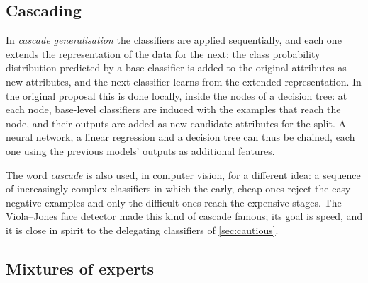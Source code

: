\subsection{Cascading}

In \emph{cascade generalisation} \citep{gama2000cascade} the classifiers are applied
sequentially, and each one extends the representation of the data for the next: the class
probability distribution predicted by a base classifier is added to the original attributes as
new attributes, and the next classifier learns from the extended representation. In the
original proposal this is done locally, inside the nodes of a decision tree: at each node,
base-level classifiers are induced with the examples that reach the node, and their outputs are
added as new candidate attributes for the split. A neural network, a linear regression and a
decision tree can thus be chained, each one using the previous models' outputs as additional
features.

The word \emph{cascade} is also used, in computer vision, for a different idea: a sequence of
increasingly complex classifiers in which the early, cheap ones reject the easy negative examples
and only the difficult ones reach the expensive stages. The Viola--Jones face detector
\citep{viola2001rapid} made this kind of cascade famous; its goal is speed, and it is close in
spirit to the delegating classifiers of \cref{sec:cautious}.

\subsection{Mixtures of experts}

